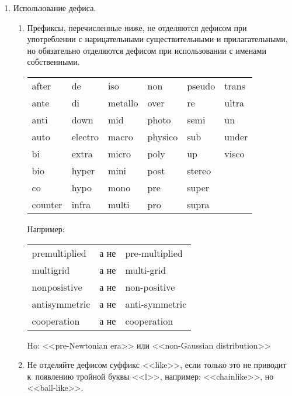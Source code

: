 \documentclass[a5paper, 10pt, twoside, numbers=enddot]{scrartcl}
\begin{document}
\begin{enumerate}
  \item Использование дефиса.
    \begin{enumerate}
      \item Префиксы, перечисленные ниже, не отделяются дефисом при употреблении с нарицательными
        существительными и прилагательными, но обязательно отделяются дефисом при использовании с
        именами собственными.
        \begin{center}
          \sffamily
          \begin{tabular}{llllll}
            after    & de       & iso      & non      & pseudo  & trans\\
            ante     & di       & metallo  & over     & re      & ultra\\
            anti     & down     & mid      & photo    & semi    & un\\
            auto     & electro  & macro    & physico  & sub     & under\\
            bi       & extra    & micro    & poly     & up      & visco\\
            bio      & hyper    & mini     & post     & stereo  &\\
            co       & hypo     & mono     & pre      & super   &\\
            counter  & infra    & multi    & pro      & supra   &\\
          \end{tabular}
        \end{center}
        Например:
        \begin{center}
          \sffamily
          \begin{tabular}{lll}
            premultiplied  & а не & pre-multiplied\\
            multigrid      & а не & multi-grid\\
            nonposistive   & а не & non-positive\\
            antisymmetric  & а не & anti-symmetric\\
            cooperation    & а не & cooperation
          \end{tabular}
        \end{center}
        Ho: <<pre-Newtonian era>> или <<non-Gaussian distribution>>

      \item Не отделяйте дефисом суффикс <<like>>, если только это не приводит к~появлению тройной
        буквы <<l>>, например: <<chainlike>>, но <<ball-like>>.


\end{enumerate}
\end{enumerate}
\end{document}
